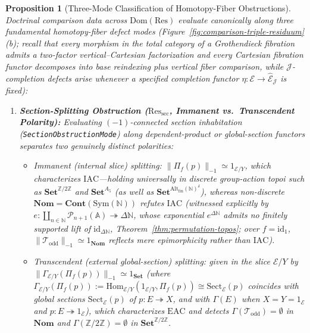 \documentclass[10pt,twoside,openright]{book}
\theoremstyle{crmplain}
\newtheorem{proposition}[theorem]{Proposition}
\theoremstyle{crmdef}
\theoremstyle{crmremark}
\newcommand{\lean}[1]{\ignorespaces}
\newcommand{\leanwitness}{\ignorespaces}
\begin{document}
\begin{proposition}[Three-Mode Classification of Homotopy-Fiber Obstructions]\label{prop:tri-modal-factorization}%
\lean{HomotopyCRM.intToZMod2TypeMode_sectionSpace_nontrivial, HomotopyCRM.not_intToZMod2TypeMode_contractible, HomotopyCRM.isEmpty_intToZMod2AbMode_sectionSpace, HomotopyCRM.profiniteLassoTowerMode_hasPhantom, HomotopyCRM.stepProductTowerMode_hasPhantom}%
\leanwitness%
%
Doctrinal comparison data across $\mathrm{Dom}(\mathrm{Res})$ evaluate canonically along three fundamental homotopy-fiber defect modes (Figure~\ref{fig:comparison-triple-residuum}(b); recall that every morphism in the total category of a Grothendieck fibration admits a two-factor vertical--Cartesian factorization and every Cartesian fibration functor decomposes into base reindexing plus vertical fiber comparison, while $\mathcal{J}$-completion defects arise whenever a specified completion functor $\eta : \mathcal{E} \to \widehat{\mathcal{E}}_{\mathcal{J}}$ is fixed):
\begin{enumerate}[label=\textbf{Mode~(\roman*).},leftmargin=4.2em]
  \item \textbf{Section-Splitting Obstruction ($\mathrm{Res}_{\mathrm{sec}}$, Immanent vs.\ Transcendent Polarity):} Evaluating $(-1)$-connected section inhabitation (\texttt{SectionObstructionMode}) along dependent-product or global-section functors separates two genuinely distinct polarities:
  \begin{itemize}[leftmargin=1.2em,noitemsep,topsep=2pt]
    \item \emph{Immanent (internal slice) splitting:} $\|\Pi_f(p)\|_{-1} \simeq 1_{\mathcal{E}/Y}$, which characterizes $\mathrm{IAC}$---holding universally in discrete group-action topoi such as $\mathbf{Set}^{\mathbb{Z}/2\mathbb{Z}}$ and $\mathbf{Set}^{A_5}$ (as well as $\mathbf{Set}^{\mathrm{Alt}_{\mathrm{fin}}(\mathbb{N})^\delta}$), whereas non-discrete $\mathbf{Nom} = \mathbf{Cont}(\mathrm{Sym}(\mathbb{N}))$ \emph{refutes} $\mathrm{IAC}$ (witnessed explicitly by $e : \coprod_{n \in \mathbb{N}} \mathcal{P}_{n+1}(\mathbb{A}) \twoheadrightarrow \Delta\mathbb{N}$, whose exponential $e^{\Delta\mathbb{N}}$ admits no finitely supported lift of $\mathrm{id}_{\Delta\mathbb{N}}$, Theorem~\ref{thm:permutation-topos}; over $f = \mathrm{id}_1$, $\|\mathcal{T}_{\mathrm{odd}}\|_{-1} \simeq 1_{\mathbf{Nom}}$ reflects mere epimorphicity rather than $\mathrm{IAC}$).
    \item \emph{Transcendent (external global-section) splitting:} given in the slice $\mathcal{E}/Y$ by $\|\Gamma_{\mathcal{E}/Y}(\Pi_f(p))\|_{-1} \simeq 1_{\mathbf{Set}}$ (where $\Gamma_{\mathcal{E}/Y}(\Pi_f(p)) := \mathrm{Hom}_{\mathcal{E}/Y}(1_{\mathcal{E}/Y}, \Pi_f(p)) \cong \mathrm{Sect}_{\mathcal{E}}(p)$ coincides with global sections $\mathrm{Sect}_{\mathcal{E}}(p)$ of $p : E \twoheadrightarrow X$, and with $\Gamma(E)$ when $X = Y = 1_{\mathcal{E}}$ and $p : E \twoheadrightarrow 1_{\mathcal{E}}$), which characterizes $\mathrm{EAC}$ and detects $\Gamma(\mathcal{T}_{\mathrm{odd}}) = \emptyset$ in $\mathbf{Nom}$ and $\Gamma(\mathbb{Z}/2\mathbb{Z}) = \emptyset$ in $\mathbf{Set}^{\mathbb{Z}/2\mathbb{Z}}$.

\end{itemize}
\end{enumerate}
\end{proposition}
\end{document}

